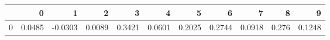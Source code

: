 \begin{tabular}{lrrrrrrrrrr}
\toprule
{} &       0 &       1 &       2 &       3 &       4 &       5 &       6 &       7 &      8 &       9 \\
\midrule
0 &  0.0485 & -0.0303 &  0.0089 &  0.3421 &  0.0601 &  0.2025 &  0.2744 &  0.0918 &  0.276 &  0.1248 \\
\bottomrule
\end{tabular}
